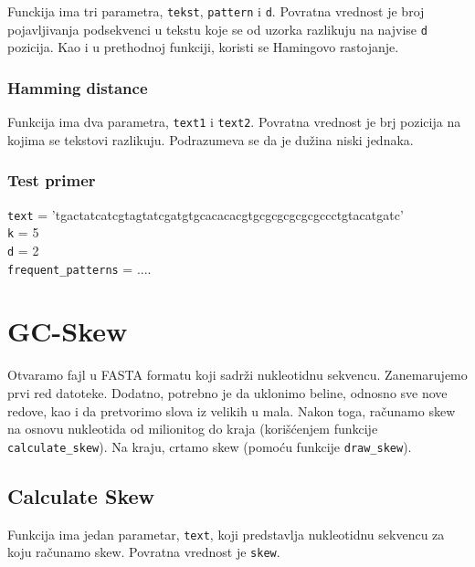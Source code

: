 Funckija ima tri parametra, \texttt{tekst}, \texttt{pattern} i \texttt{d}. Povratna vrednost je broj pojavljivanja podsekvenci u tekstu koje se od uzorka razlikuju na najvise \texttt{d} pozicija. Kao i u prethodnoj funkciji, koristi se Hamingovo rastojanje.




\subsubsection{Hamming distance}
\label{hammingDistance}

Funkcija ima dva parametra, \texttt{text1} i \texttt{text2}. Povratna vrednost je brj pozicija na kojima se tekstovi razlikuju. Podrazumeva se da je dužina niski jednaka. 





\subsubsection{Test primer}
\noindent\texttt{text} = 'tgactatcatcgtagtatcgatgtgcacacacgtgcgcgcgcgcgccctgtacatgatc' \\\texttt{k} = 5
\\\texttt{d} = 2
\\\texttt{frequent\_patterns} = ....



\section{GC-Skew}

Otvaramo fajl u FASTA formatu koji sadrži nukleotidnu sekvencu. Zanemarujemo prvi red datoteke. Dodatno, potrebno je da uklonimo beline, odnosno sve nove redove, kao i da pretvorimo slova iz velikih u mala. Nakon toga, računamo skew na osnovu nukleotida od milionitog do kraja (korišćenjem funkcije \texttt{calculate\_skew}). Na kraju, crtamo skew (pomoću funkcije \texttt{draw\_skew}).



\subsection{Calculate Skew}

Funkcija ima jedan parametar, \texttt{text}, koji predstavlja nukleotidnu sekvencu za koju računamo skew. Povratna vrednost je \texttt{skew}.

